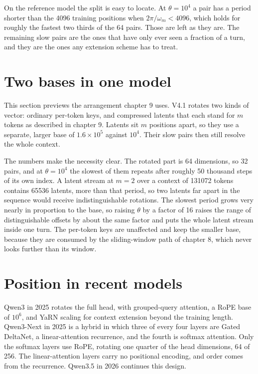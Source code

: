 On the reference model the split is easy to locate. At \(\theta = 10^4\)
a pair has a period shorter than the 4096 training positions when
\(2\pi / \omega_m < 4096\), which holds for roughly the fastest two
thirds of the 64 pairs. Those are left as they are. The remaining slow
pairs are the ones that have only ever seen a fraction of a turn, and
they are the ones any extension scheme has to treat.

\hypertarget{two-bases-in-one-model}{%
\section{Two bases in one model}\label{two-bases-in-one-model}}

This section previews the arrangement chapter 9 uses. V4.1 rotates two
kinds of vector: ordinary per-token keys, and compressed latents that
each stand for \(m\) tokens as described in chapter 9. Latents sit \(m\)
positions apart, so they use a separate, larger base of
\(1.6 \times 10^5\) against \(10^4\). Their slow pairs then still
resolve the whole context.

The numbers make the necessity clear. The rotated part is 64 dimensions,
so 32 pairs, and at \(\theta = 10^4\) the slowest of them repeats after
roughly 50 thousand steps of its own index. A latent stream at \(m = 2\)
over a context of 131072 tokens contains 65536 latents, more than that
period, so two latents far apart in the sequence would receive
indistinguishable rotations. The slowest period grows very nearly in
proportion to the base, so raising \(\theta\) by a factor of 16 raises
the range of distinguishable offsets by about the same factor and puts
the whole latent stream inside one turn. The per-token keys are
unaffected and keep the smaller base, because they are consumed by the
sliding-window path of chapter 8, which never looks further than its
window.

\hypertarget{position-in-recent-models}{%
\section{Position in recent models}\label{position-in-recent-models}}

Qwen3 in 2025 rotates the full head, with grouped-query attention, a
RoPE base of \(10^6\), and YaRN scaling for context extension beyond the
training length. Qwen3-Next in 2025 is a hybrid in which three of every
four layers are Gated DeltaNet, a linear-attention recurrence, and the
fourth is softmax attention. Only the softmax layers use RoPE, rotating
one quarter of the head dimensions, 64 of 256. The linear-attention
layers carry no positional encoding, and order comes from the
recurrence. Qwen3.5 in 2026 continues this design.

